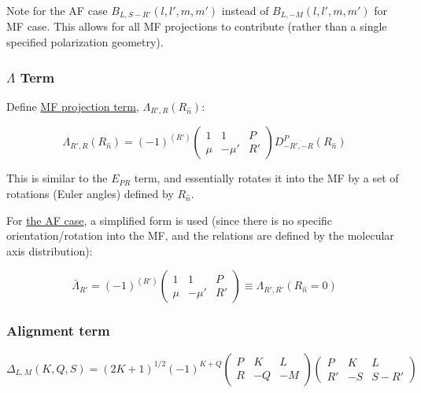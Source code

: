 Note for the AF case \(B_{L,S-R'}(l,l',m,m')\) instead of
\(B_{L,-M}(l,l',m,m')\) for MF case. This allows for all MF projections
to contribute (rather than a single specified polarization geometry).

\subsubsection{\texorpdfstring{\(\Lambda\)
Term}{\textbackslash{}Lambda Term}}\label{lambda-term}

Define
\href{https://epsproc.readthedocs.io/en/latest/methods/geometric_method_dev_260220_090420_tidy.html\#/Lambda-Term}{MF
projection term}, \(\Lambda_{R',R}(R_{\hat{n}})\):

\begin{equation}
\Lambda_{R',R}(R_{\hat{n}})=(-1)^{(R')}\left(\begin{array}{ccc}
1 & 1 & P\\
\mu & -\mu' & R'
\end{array}\right)D_{-R',-R}^{P}(R_{\hat{n}})
\end{equation}

This is similar to the \(E_{PR}\) term, and essentially rotates it into
the MF by a set of rotations (Euler angles) defined by \(R_{\hat{n}}\).

For
\href{https://epsproc.readthedocs.io/en/latest/methods/geometric_method_dev_pt3_AFBLM_090620_010920_dev_bk100920.html\#/beta_\%7BL,M\%7D\%5E\%7BAF\%7D-rewrite}{the
AF case}, a simplified form is used (since there is no specific
orientation/rotation into the MF, and the relations are defined by the
molecular axis distribution):

\begin{equation}
\bar{\Lambda}_{R'}=(-1)^{(R')}\left(\begin{array}{ccc}
1 & 1 & P\\
\mu & -\mu' & R'
\end{array}\right)\equiv\Lambda_{R',R'}(R_{\hat{n}}=0)
\end{equation}

\subsubsection{Alignment term}\label{alignment-term}

\begin{equation}
\Delta_{L,M}(K,Q,S)=(2K+1)^{1/2}(-1)^{K+Q}\left(\begin{array}{ccc}
P & K & L\\
R & -Q & -M
\end{array}\right)\left(\begin{array}{ccc}
P & K & L\\
R' & -S & S-R'
\end{array}\right)
\end{equation}

